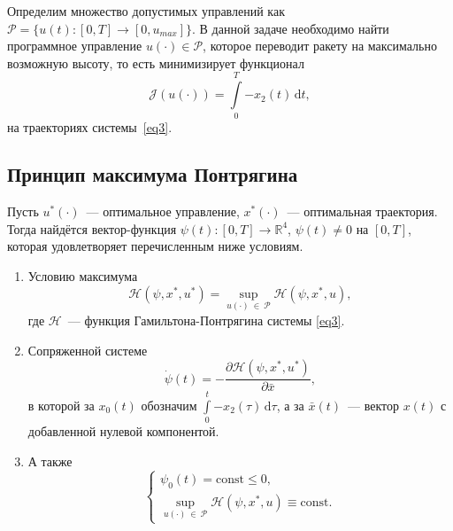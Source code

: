 \documentclass[a4paper,12pt]{article}
\begin{document}
Определим множество допустимых управлений как $\mathcal{P} = \{u(t) \! : [0, T] \rightarrow [0, u_{max}] \}$. В данной задаче необходимо найти программное управление $u(\cdot) \in \mathcal{P}$, которое переводит ракету на максимально возможную высоту, то есть минимизирует функционал 
\[\mathcal{J}(u(\cdot)) = \int\limits_{0}^{T}{-x_2(t)} \, \mathrm{d}t, \] на траекториях системы~\eqref{eq3}. 

\subsection{Принцип максимума Понтрягина}
Пусть $u^{*}(\cdot)$~--- оптимальное управление, $x^{*}(\cdot)$~--- оптимальная траектория. Тогда найдётся вектор-функция  $\psi(t) \! : [0, T] \rightarrow \mathbb{R}^4$, $\psi(t) \neq 0$ на $[0, T]$, которая удовлетворяет перечисленным ниже условиям.
\begin{enumerate}

\item Условию максимума
\hypertarget{p4}{}
\begin{equation}\label{eq4} 
\mathcal{H}(\psi, x^*, u^*) = \sup_{u(\cdot) \ \in \ \mathcal{P}}{\mathcal{H}(\psi, x^*, u)},
\end{equation} 
где $\mathcal{H}$~--- функция Гамильтона-Понтрягина системы \eqref{eq3}.

\item Сопряженной системе
\hypertarget{p5}{}
\begin{equation}\label{eq5}
\dot{\psi}(t) = - \dfrac{\partial{\mathcal{H}(\psi, x^*, u^*)}}{\partial{\bar{x}}},
\end{equation}
в которой за $x_0(t)$ обозначим $\int\limits_{0}^{t}{-x_2(\tau)} \, \mathrm{d}\tau$, а за $\bar{x}(t)$~--- вектор $x(t)$ с добавленной нулевой компонентой.

\item А также
\hypertarget{p7}{}
\begin{equation}\label{eq7}
	\begin{cases}
		\psi_0(t) = \mathrm{const} \leqslant 0, \\
		\sup\limits_{u(\cdot) \ \in \ \mathcal{P}}{\mathcal{H}(\psi, x^*, u)} \equiv \mathrm{const}.
	\end{cases}
\end{equation} 

\end{enumerate}
\end{document}
